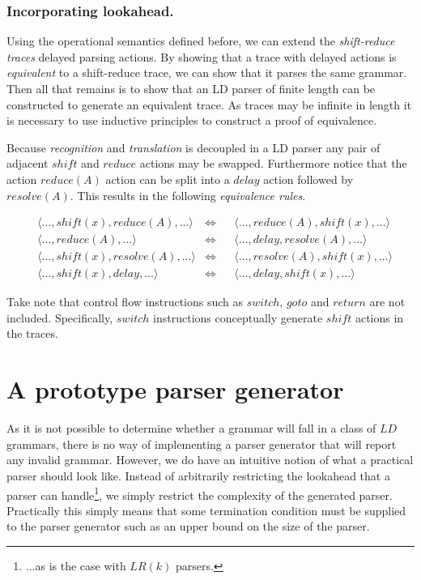 \documentclass[envcountsame,runningheads]{llncs}
\begin{document}
\subsubsection{Incorporating lookahead.}

Using the operational semantics defined before, we can extend the \emph{shift-reduce traces} delayed parsing actions.
By showing that a trace with delayed actions is \emph{equivalent} to a shift-reduce trace, we can show that it parses the same grammar.
Then all that remains is to show that an LD parser of finite length can be constructed to generate an equivalent trace.
As traces may be infinite in length it is necessary to use inductive principles to construct a proof of equivalence.

Because \emph{recognition} and \emph{translation} is decoupled in a LD parser any pair of adjacent $shi\!ft$ and $reduce$ actions may be swapped.
Furthermore notice that the action $reduce(A)$ action can be split into a $delay$ action followed by $resolve(A)$.
This results in the following \emph{equivalence rules}.

\begin{align*}
&\langle ..., shi\!ft(x), reduce(A), ... \rangle  &\iff&& \langle ..., reduce(A), shi\!ft(x), ... \rangle \tag{eq-1}\\
&\langle ..., reduce(A), ... \rangle              &\iff&& \langle ..., delay, resolve(A), ... \rangle \tag{eq-2}\\
&\langle ..., shi\!ft(x), resolve(A), ... \rangle &\iff&& \langle ..., resolve(A), shi\!ft(x), ... \rangle \tag{eq-3}\\
&\langle ..., shi\!ft(x), delay, ... \rangle      &\iff&& \langle ..., delay, shi\!ft(x), ... \rangle \tag{eq-4}
\end{align*}

Take note that control flow instructions such as $switch$, $goto$ and $return$ are not included.
Specifically, $switch$ instructions conceptually generate $shi\!ft$ actions in the traces.


\section{A prototype parser generator}

As it is not possible to determine whether a grammar will fall in a class of $LD$ grammars,
there is no way of implementing a parser generator that will report any invalid grammar.
However, we do have an intuitive notion of what a practical parser should look like.
Instead of arbitrarily restricting the lookahead that a parser can handle\footnote{...as is the case with $LR(k)$ parsers.},
we simply restrict the complexity of the generated parser.
Practically this simply means that some termination condition must be supplied to the parser generator such as an upper bound on the size of the parser.
\end{document}
